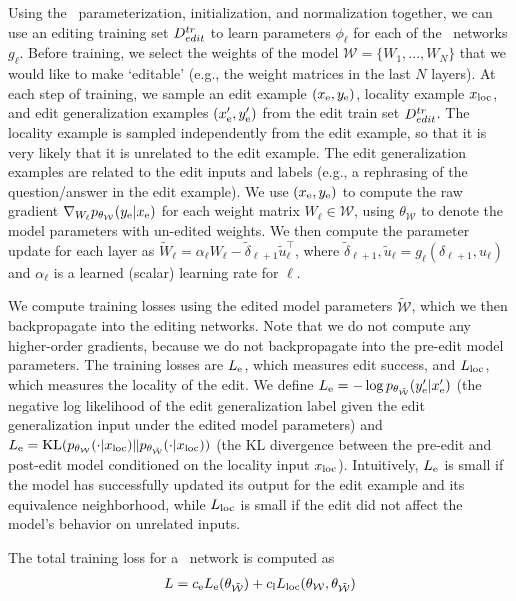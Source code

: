 \documentclass{article}
\begin{document}



Using the \name~parameterization, initialization, and normalization together, we can use an editing training set $D^{tr}_{edit}$ to learn parameters $\phi_\ell$ for each of the \name~networks $g_\ell$. Before training, we select the weights of the model $\mathcal{W}=\{W_1,...,W_N\}$ that we would like to make `editable' (e.g., the weight matrices in the last $N$ layers). At each step of training, we sample an edit example $(x_\text{e},y_\text{e})$, locality example $x_\text{loc}$, and edit generalization examples $(x_\text{e}',y_\text{e}')$ from the edit train set $D^{tr}_{edit}$. The locality example is sampled independently from the edit example, so that it is very likely that it is unrelated to the edit example. The edit generalization examples are related to the edit inputs and labels (e.g., a rephrasing of the question/answer in the edit example). We use $(x_\text{e},y_\text{e})$ to compute the raw gradient $\nabla_{W_\ell}p_{\theta_\mathcal{W}}(y_\text{e}|x_\text{e})$ for each weight matrix $W_\ell\in\mathcal{W}$, using $\theta_\mathcal{W}$ to denote the model parameters with un-edited weights. We then compute the parameter update for each layer as $\tilde W_\ell = \alpha_\ell W_\ell - \tilde\delta_{\ell+1}\tilde u_\ell^{\top}$, where $\tilde \delta_{\ell+1}, \tilde u_\ell = g_\ell(\delta_{\ell+1},u_\ell)$ and $\alpha_\ell$ is a learned (scalar) learning rate for $\ell$.

We compute training losses using the edited model parameters $\mathcal{\tilde W}$, which we then backpropagate into the editing networks. Note that we do not compute any higher-order gradients, because we do not backpropagate into the pre-edit model parameters. The training losses are $L_\text{e}$, which measures edit success, and $L_\text{loc}$, which measures the locality of the edit. We define $L_\text{e} = -\log p_{\theta_\mathcal{\tilde W}}(y_\text{e}'|x_\text{e}')$ (the negative log likelihood of the edit generalization label given the edit generalization input under the edited model parameters) and $L_\text{e} = \text{KL}(p_{\theta_\mathcal{W}}(\cdot|x_\text{loc}) \| p_{\theta_\mathcal{\tilde W}}(\cdot|x_\text{loc}))$ (the KL divergence between the pre-edit and post-edit model conditioned on the locality input $x_\text{loc}$). Intuitively, $L_\text{e}$ is small if the model has successfully updated its output for the edit example and its equivalence neighborhood, while $L_\text{loc}$ is small if the edit did not affect the model's behavior on unrelated inputs.

The total training loss for a \name~network is computed as
\begin{align}
    L = c_\text{e} L_\text{e}(\theta_\mathcal{\tilde W}) + c_\text{l} L_\text{loc}(\theta_\mathcal{W},\theta_\mathcal{\tilde W})
\end{align}
\end{document}
